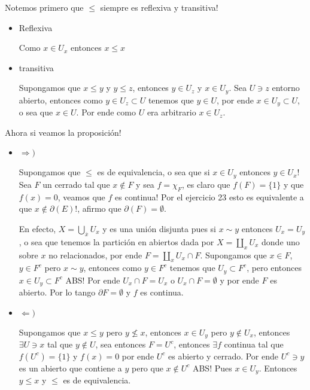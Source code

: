\documentclass[11pt]{article}
\newcommand{\sett}[1]{\{#1\}}
\newenvironment{proof}[1][Demostraci\'on]{\begin{trivlist}
\item[\hskip \labelsep {\bfseries #1}]}{\end{trivlist}}
\newcommand{\qed}{\nobreak \ifvmode \relax \else
      \ifdim\lastskip<1.5em \hskip-\lastskip
      \hskip1.5em plus0em minus0.5em \fi \nobreak
      \vrule height0.75em width0.5em depth0.25em\fi}
\begin{document}
\begin{proof}
Notemos primero que $\leq$ siempre es reflexiva y transitiva!

\begin{itemize}
\item {Reflexiva}

Como $x \in U_x$ entonces $x \leq x$

\item {transitiva}

Supongamos que $x \leq y$ y $y \leq z$, entonces $y \in U_z$ y $x \in U_y$. Sea $U \ni z$ entorno abierto, entonces como $y \in U_z \subset U$ tenemos que $y \in U$, por ende $x \in U_y \subset U$, o sea que $x \in U$. Por ende como $U$ era arbitrario $x \in U_z$. 
\end{itemize}

Ahora si veamos la proposici\'on!

\begin{itemize}

\item {$\Longrightarrow)$}

Supongamos que $\leq$ es de equivalencia, o sea que si $x \in U_y$ entonces $y \in U_x$! Sea $F$ un cerrado tal que $x \not \in F$ y sea $f = \chi_F$, es claro que $f(F)=\sett{1}$ y que $f(x)=0$, veamos que $f$ es continua! Por el ejercicio 23 esto es equivalente a que $x \not \in \partial(E)!$, afirmo que $\partial(F) = \emptyset$.

En efecto, $X = \bigcup_{\overline{x}}{U_x}$ y es una uni\'on disjunta pues si $x \sim y$ entonces $U_x = U_y$, o sea que tenemos la partici\'on en abiertos dada por $X = \coprod_{x}{U_x}$ donde uno sobre $x$ no relacionados, por ende $F = \coprod_{x} {U_x \cap F}$. Supongamos que $x \in F$, $y \in F^{c}$ pero $x \sim y$, entonces como $y \in F^{c}$ tenemos que $U_y \subset F^{c}$, pero entonces $x \in U_y \subset F^{c}$ ABS! Por ende $U_x \cap F = U_x$ o $U_x \cap F = \emptyset$ y por ende $F$ es abierto. Por lo tango $\partial{F} = \emptyset$ y $f$ es continua.

\item {$\Longleftarrow)$}

Supongamos que $x \leq y$ pero $y \not \leq x$, entonces $x \in U_y$ pero $y \not \in U_x$, entonces $\exists U \ni x$ tal que $y \not \in U$, sea entonces $F = U^{c}$, entonces $\exists f$ continua tal que $f(U^{c})=\sett{1}$ y $f(x)=0$ por ende $U^{c}$ es abierto y cerrado. Por ende $U^{c} \ni y$ es un abierto que contiene a $y$ pero que $x \not \in U^{c}$ ABS! Pues $x \in U_y$. Entonces $y \leq x$ y $\leq$ es de equivalencia.  \qed

\end{itemize}

\end{proof}
\end{document}

